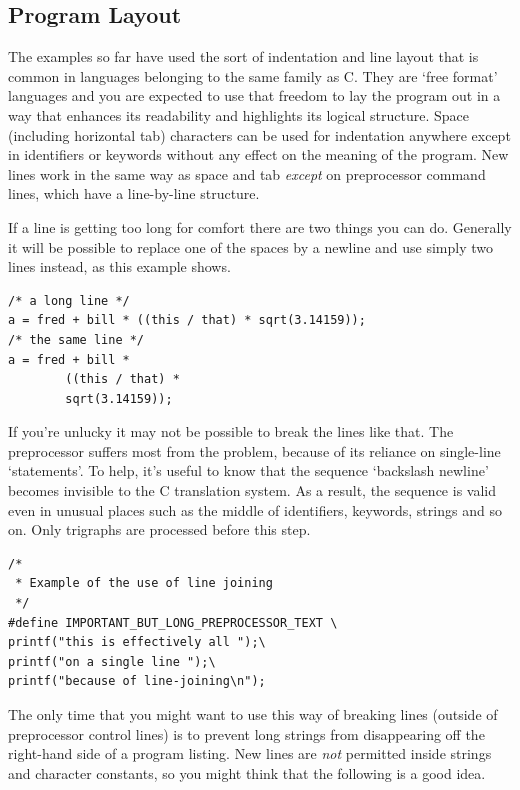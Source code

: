   

  \subsection{Program Layout}
   

   The examples so far have used the sort of indentation and line layout
    that is common in languages belonging to the same family as C. They
    are `free format' languages and you are expected to use that freedom
    to lay the program out in a way that enhances its readability and
    highlights its logical structure. Space (including horizontal tab)
    characters can be used for indentation anywhere except in identifiers or
    keywords without any effect on the meaning of the program. New lines work
    in the same way as space and tab \textit{except} on preprocessor command
    lines, which have a line-by-line structure.


   If a line is getting too long for comfort there are two things you can
    do. Generally it will be possible to replace one of the spaces by a
    newline and use simply two lines instead, as this example shows.


   \begin{Verbatim}
/* a long line */
a = fred + bill * ((this / that) * sqrt(3.14159));
/* the same line */
a = fred + bill *
        ((this / that) *
        sqrt(3.14159));
\end{Verbatim}

   If you're unlucky it may not be possible to break the lines like that.
    The preprocessor suffers most from the problem, because of its reliance
    on single-line `statements'. To help, it's useful to know that the
    sequence `backslash newline' becomes invisible to the C translation
    system. As a result, the sequence is valid even in unusual places such as
    the middle of identifiers, keywords, strings and so on. Only trigraphs
    are processed before this step.


   \begin{Verbatim}
/*
 * Example of the use of line joining
 */
#define IMPORTANT_BUT_LONG_PREPROCESSOR_TEXT \
printf("this is effectively all ");\
printf("on a single line ");\
printf("because of line-joining\n");
\end{Verbatim}

   The only time that you might want to use this way of breaking lines
    (outside of preprocessor control lines) is to prevent long strings from
    disappearing off the right-hand side of a program listing. New lines are
    \textit{not} permitted inside strings and character constants, so you
    might think that the following is a good idea.


